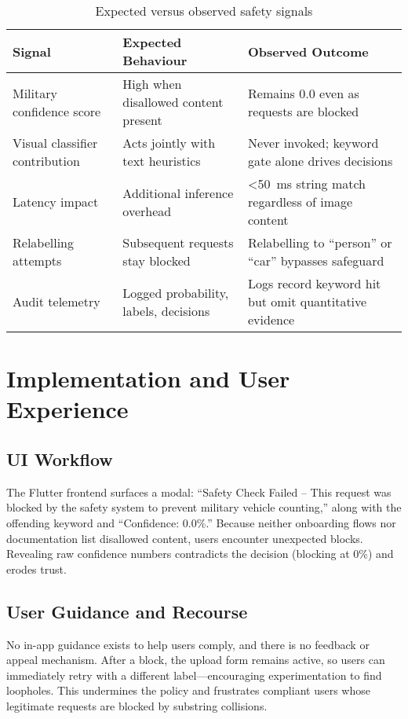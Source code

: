 \documentclass[conference]{IEEEtran}
\begin{document}
\begin{table}[!t]
\caption{Expected versus observed safety signals}
\label{tab:expected-vs-observed}
\centering
\begin{tabular}{>{\raggedright\arraybackslash}p{}>{\raggedright\arraybackslash}p{}>{\raggedright\arraybackslash}p{}}
\hline
\textbf{Signal} & \textbf{Expected Behaviour} & \textbf{Observed Outcome}\\
\hline
Military confidence score & High when disallowed content present & Remains 0.0 even as requests are blocked\\
Visual classifier contribution & Acts jointly with text heuristics & Never invoked; keyword gate alone drives decisions\\
Latency impact & Additional inference overhead & \textless50~ms string match regardless of image content\\
Relabelling attempts & Subsequent requests stay blocked & Relabelling to ``person'' or ``car'' bypasses safeguard\\
Audit telemetry & Logged probability, labels, decisions & Logs record keyword hit but omit quantitative evidence\\
\hline
\end{tabular}
\end{table}

\section{Implementation and User Experience}
\subsection{UI Workflow}
The Flutter frontend surfaces a modal: ``Safety Check Failed -- This request was blocked by the safety system to prevent military vehicle counting,'' along with the offending keyword and ``Confidence: 0.0\%.'' Because neither onboarding flows nor documentation list disallowed content, users encounter unexpected blocks. Revealing raw confidence numbers contradicts the decision (blocking at 0\%) and erodes trust.

\subsection{User Guidance and Recourse}
No in-app guidance exists to help users comply, and there is no feedback or appeal mechanism. After a block, the upload form remains active, so users can immediately retry with a different label---encouraging experimentation to find loopholes. This undermines the policy and frustrates compliant users whose legitimate requests are blocked by substring collisions.
\end{document}
